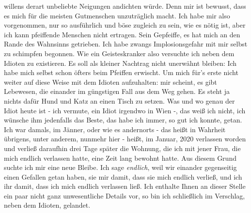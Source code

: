 \documentclass{scrbook}
\begin{document}
willens derart unbeliebte Neigungen andichten würde. Denn mir ist bewusst,
dass es mich für die meisten Gutmenschen unzuträglich macht. Ich habe mir
also vorgenommen, nur so ausführlich und böse zugleich zu sein, wie es nötig
ist, aber ich kann pfeiffende Menschen nicht ertragen. Sein Gepfeiffe, es hat
mich an den Rande des Wahnsinns getrieben. Ich habe zwangs Implosionsgefahr
mit mir selbst zu schimpfen begonnen. Wie ein Geisteskranker also versuchte
ich neben dem Idioten zu existieren. Es soll als kleiner Nachtrag nicht
unerwähnt bleiben: Ich habe mich selbst schon öfters beim Pfeiffen erwischt.
Um mich für's erste nicht weiter auf diese Weise mit dem Idioten aufzuhalten:
mir scheint, es gibt Lebewesen, die einander im güngstigen Fall aus dem Weg
gehen. Es steht ja nichts dafür Hund und Katz an einen Tisch zu setzen. Was
und wo genau der Idiot heute ist - ich vermute, ein Idiot irgendwo in Wien -,
das weiß ich nicht, ich wünsche ihm jedenfalls das Beste, das habe ich immer,
so gut ich konnte, getan. Ich war damals, im Jänner, oder wie es andernorts -
das heißt in Wahrheit übrigens, unter anderem, nunmehr hier - heißt, im
Januar, 2020 verlassen worden und verließ daraufhin drei Tage später die
Wohnung, die ich mit jener Frau, die mich endlich verlassen hatte, eine Zeit
lang bewohnt hatte. Aus diesem Grund suchte ich mir eine neue Bleibe. Ich
sage \textit{endlich}, weil wir einander gegenseitig einen Gefallen getan
haben, sie mir damit, dass sie mich endlich verließ, und ich ihr damit, dass
ich mich endlich verlassen ließ. Ich enthalte Ihnen an dieser Stelle ein paar
nicht ganz unwesentliche Details vor, so bin ich schließlich im Verschlag,
neben dem Idioten, gelandet.
\end{document}
